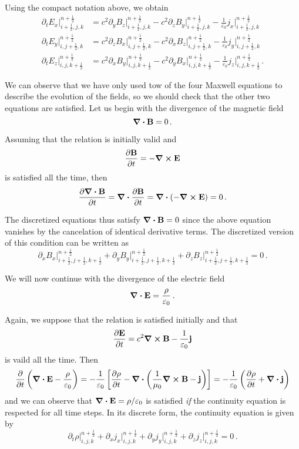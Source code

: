 \documentclass[12pt, class=report, crop=false]{standalone}
\begin{document}
Using the compact notation above, we obtain
\begin{align*}
  \partial_t E_x \rvert^{n+\frac{1}{2}}_{i+\frac{1}{2},j,k} &=
  c^2\partial_y B_z \rvert^{n+\frac{1}{2}}_{i+\frac{1}{2},j,k}
  -c^2\partial_z B_y \rvert^{n+\frac{1}{2}}_{i+\frac{1}{2},j,k}
  -\frac{1}{\varepsilon_0} j_x \rvert^{n+\frac{1}{2}}_{i+\frac{1}{2},j,k} \\
  \partial_t E_y \rvert^{n+\frac{1}{2}}_{i,j+\frac{1}{2},k} &=
  c^2\partial_z B_x \rvert^{n+\frac{1}{2}}_{i,j+\frac{1}{2},k}
  -c^2\partial_x B_z \rvert^{n+\frac{1}{2}}_{i,j+\frac{1}{2},k}
  -\frac{1}{\varepsilon_0} j_y \rvert^{n+\frac{1}{2}}_{i,j+\frac{1}{2},k} \\
  \partial_t E_z \rvert^{n+\frac{1}{2}}_{i,j,k+\frac{1}{2}} &=
  c^2\partial_x B_y \rvert^{n+\frac{1}{2}}_{i,j,k+\frac{1}{2}}
  -c^2\partial_y B_x \rvert^{n+\frac{1}{2}}_{i,j,k+\frac{1}{2}}
  -\frac{1}{\varepsilon_0} j_z \rvert^{n+\frac{1}{2}}_{i,j,k+\frac{1}{2}} \,.
\end{align*}

We can observe that we have only used tow of the four Maxwell equations to describe
the evolution of the fields, so we should check that the other two equations are
satisfied.
Let us begin with the divergence of the magnetic field
\[
\div{\vb{B}} = 0 \,.
\]

Assuming that the relation is initially valid and
\[
\pdv{\vb{B}}{t} = - \curl{\vb{E}}
\]
is satisfied all the time, then
\[
\pdv{\div{\vb{B}}}{t} = \div{\pdv{\vb{B}}{t}} = \div{\left(-\curl{\vb{E}}\right)} = 0\,.
\]

The discretized equations thus satisfy \(\div{\vb{B}} = 0\) since the above equation
vanishes by the cancelation of identical derivative terms.
The discretized version of this condition can be written as
\[
\partial_x B_x \rvert^{n+\frac{1}{2}}_{i+\frac{1}{2},j+\frac{1}{2},k+\frac{1}{2}} +
\partial_y B_y \rvert^{n+\frac{1}{2}}_{i+\frac{1}{2},j+\frac{1}{2},k+\frac{1}{2}} +
\partial_z B_z \rvert^{n+\frac{1}{2}}_{i+\frac{1}{2},j+\frac{1}{2},k+\frac{1}{2}}
= 0\,.
\]

We will now continue with the divergence of the electric field
\[
\div{\vb{E}} = \frac{\rho}{\varepsilon_0} \,.
\]

Again, we suppose that the relation is satisfied initially and that
\[
\pdv{\vb{E}}{t} = c^2 \curl{\vb{B}} - \frac{1}{\varepsilon_0} \vb{j}
\]
is vaild all the time. Then
\[
\pdv{t} \left(\div{\vb{E}} - \frac{\rho}{\varepsilon_0}\right) =
-\frac{1}{\varepsilon_0} \left[\pdv{\rho}{t}
-\div{\left(\frac{1}{\mu_0} \curl{\vb{B}} - \vb{j}\right)}\right] =
-\frac{1}{\varepsilon_0} \left(\pdv{\rho}{t} + \div{\vb{j}}\right)
\]
and we can observe that
\(
\div{\vb{E}} = \rho/\varepsilon_0
\)
is satisfied \emph{if} the continuity equation is respected for all time steps.
In its discrete form, the continuity equation is given by
\[
\partial_t \rho \rvert^{n+\frac{1}{2}}_{i,j,k} +
\partial_x j_x \rvert^{n+\frac{1}{2}}_{i,j,k} +
\partial_y j_y \rvert^{n+\frac{1}{2}}_{i,j,k} +
\partial_z j_z \rvert^{n+\frac{1}{2}}_{i,j,k}
= 0\,.
\]
\end{document}
